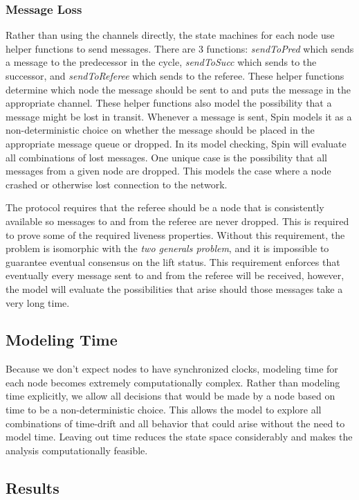 \documentclass[runningheads]{llncs}
\begin{document}
\subsubsection{Message Loss}
Rather than using the channels directly, the state machines for each node use helper functions to send messages. There are 3 functions: \emph{sendToPred} which sends a message to the predecessor in the cycle, \emph{sendToSucc} which sends to the successor, and \emph{sendToReferee} which sends to the referee. These helper functions determine which node the message should be sent to and puts the message in the appropriate channel. These helper functions also model the possibility that a message might be lost in transit. Whenever a message is sent, Spin models it as a non-deterministic choice on whether the message should be placed in the appropriate message queue or dropped. In its model checking, Spin will evaluate all combinations of lost messages. One unique case is the possibility that all messages from a given node are dropped. This models the case where a node crashed or otherwise lost connection to the network. 

The protocol requires that the referee should be a node that is consistently available so messages to and from the referee are never dropped. This is required to prove some of the required liveness properties. Without this requirement, the problem is isomorphic with the \emph{two generals problem}, and it is impossible to guarantee eventual consensus on the lift status. This requirement enforces that eventually every message sent to and from the referee will be received, however, the model will evaluate the possibilities that arise should those messages take a very long time. 

\subsection{Modeling Time}
\label{sec:model_time}
Because we don't expect nodes to have synchronized clocks, modeling time for each node becomes extremely computationally complex. Rather than modeling time explicitly, we allow all decisions that would be made by a node based on time to be a non-deterministic choice. This allows the model to explore all combinations of time-drift and all behavior that could arise without the need to model time. Leaving out time reduces the state space considerably and makes the analysis computationally feasible. 

\subsection{Results}
\end{document}
